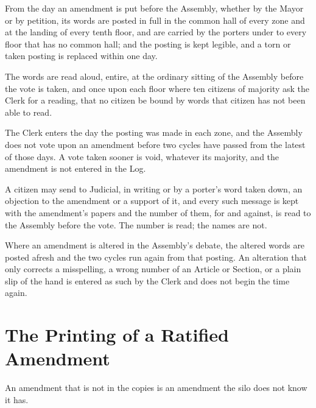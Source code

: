 \begin{clauses}
\item From the day an amendment is put before the Assembly, whether by the Mayor or by petition, its words are posted in full in the common hall of every zone and at the landing of every tenth floor, and are carried by the porters under  to every floor that has no common hall; and the posting is kept legible, and a torn or taken posting is replaced within one day.
\item The words are read aloud, entire, at the ordinary sitting of the Assembly before the vote is taken, and once upon each floor where ten citizens of majority ask the Clerk for a reading, that no citizen be bound by words that citizen has not been able to read.
\item The Clerk enters the day the posting was made in each zone, and the Assembly does not vote upon an amendment before two cycles have passed from the latest of those days. A vote taken sooner is void, whatever its majority, and the amendment is not entered in the Log.
\item A citizen may send to Judicial, in writing or by a porter's word taken down, an objection to the amendment or a support of it, and every such message is kept with the amendment's papers and the number of them, for and against, is read to the Assembly before the vote. The number is read; the names are not.
\item Where an amendment is altered in the Assembly's debate, the altered words are posted afresh and the two cycles run again from that posting. An alteration that only corrects a misspelling, a wrong number of an Article or Section, or a plain slip of the hand is entered as such by the Clerk and does not begin the time again.
\end{clauses}

\section{The Printing of a Ratified Amendment}
\label{sec:amendment:printing-of-a-ratified-amendment}

An amendment that is not in the copies is an amendment the silo does not know it has.

